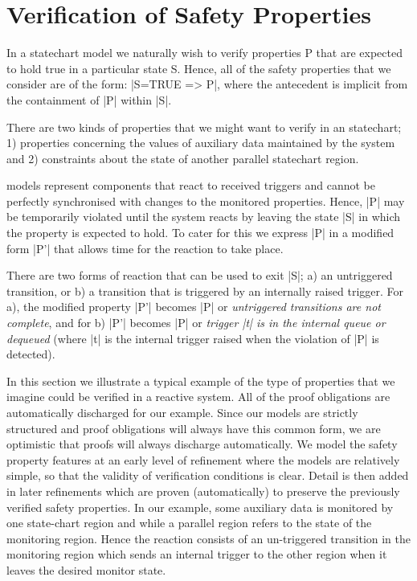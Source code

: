 

\section{Verification of Safety Properties}

In a statechart model we naturally wish to verify properties P that are expected to hold true in a particular state S.
Hence, all of the safety properties that we consider are of the form: |S=TRUE => P|, where the antecedent is implicit from the containment of |P| within |S|.

There are two kinds of properties that we might want to verify in an \SCXML statechart;
1) properties concerning the values of auxiliary data maintained by the system and 2) constraints about the state of another parallel statechart region.

\SCXML models represent components that react to received triggers and cannot be perfectly synchronised with changes to the monitored properties. 
Hence, |P| may be temporarily violated until the system reacts by leaving the state |S| in which the property is expected to hold.
To cater for this we express |P| in a modified form |P'| that allows time for the reaction to take place.

There are two forms of reaction that can be used to exit |S|; a) an untriggered transition, or b) a transition that is triggered by an internally raised trigger.
For a), the modified property |P'| becomes |P| or \emph{untriggered transitions are not complete}, and for b) |P'| becomes |P| or \emph{trigger |t| is in the internal queue or dequeued} (where |t| is the internal trigger raised when the violation of |P| is detected).


In this section we illustrate a typical example of the type of properties that we imagine could be verified in a reactive \SCXML system.
All of the proof obligations are automatically discharged for our example.
Since our models are strictly structured and proof obligations will always have this common form, we are optimistic that proofs will always discharge automatically.
We model the safety property features at an early level of refinement where the models are relatively simple, so that the validity of verification conditions is clear. 
Detail is then added in later refinements which are proven (automatically) to preserve the previously verified safety properties.
In our example, some auxiliary data is monitored by one state-chart region and while a parallel region refers to the state of the monitoring region. 
Hence the reaction consists of an un-triggered transition in the monitoring region which sends an internal trigger to the other region when it leaves the desired monitor state.

